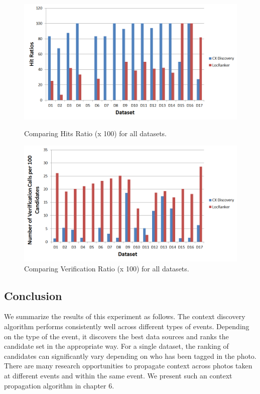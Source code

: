 \begin{figure}[h!]

\begin{minipage}[b]{\linewidth}
\centering
\includegraphics[width=\textwidth]{media/chapter5/axis/hits-ratio-comparison-all-datasets.png}
\end{minipage}
\caption{Comparing Hits Ratio (x 100) for all datasets.}
\label{fig:hits-ratio-comparison}

\vspace{0.5cm}

\begin{minipage}[b]{\linewidth}
\centering
\includegraphics[width=\textwidth]{media/chapter5/axis/verification-ratio-comparison-all-datasets.png}
\end{minipage}
\caption{Comparing Verification Ratio (x 100) for all datasets.}
\label{fig:verification-ratio-comparison}

\end{figure}

\subsection{Conclusion}
We summarize the results of this experiment as follows. The context discovery algorithm performs consistently well across different types of events. Depending on the type of the event, it discovers the best data sources and ranks the candidate set in the appropriate way. For a single dataset, the ranking of candidates can significantly vary depending on who has been tagged in the photo. There are many research opportunities to propagate context across photos taken at different events and within the same event. We present such an context propagation algorithm in chapter 6.

